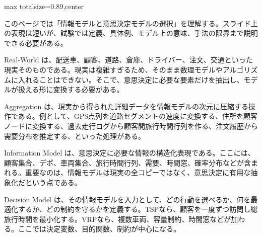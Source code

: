 \begin{minipage}[t]{0.58\textwidth}
\begin{adjustbox}{max totalsize={\textwidth}{0.89\textheight},center}
\begin{minipage}{\textwidth}\scriptsize
{}このページでは「情報モデルと意思決定モデルの選択」を理解する。スライド上の表現は短いが、試験では定義、具体例、モデル上の意味、手法の限界まで説明できる必要がある。\par
Real-World は、配送車、顧客、道路、倉庫、ドライバー、注文、交通といった現実そのものである。現実は複雑すぎるため、そのまま数理モデルやアルゴリズムに入れることはできない。そこで、意思決定に必要な要素だけを抽出し、モデルが扱える形に変換する必要がある。\par
Aggregation は、現実から得られた詳細データを情報モデルの次元に圧縮する操作である。例として、GPS点列を道路セグメントの速度に変換する、住所を顧客ノードに変換する、過去走行ログから顧客間旅行時間行列を作る、注文履歴から需要分布を推定する、といった処理がある。\par
Information Model は、意思決定に必要な情報の構造化表現である。ここには、顧客集合、デポ、車両集合、旅行時間行列、需要、時間窓、確率分布などが含まれる。重要なのは、情報モデルは現実の全コピーではなく、意思決定に有用な抽象化だという点である。\par
Decision Model は、その情報モデルを入力として、どの行動を選べるか、何を最適化するか、どの制約を守るかを定義する。TSPなら、顧客を一度ずつ訪問し総旅行時間を最小化する。VRPなら、複数車両、容量制約、時間窓などが加わる。ここでは決定変数、目的関数、制約が中心になる。\par

\end{minipage}
\end{adjustbox}
\end{minipage}
